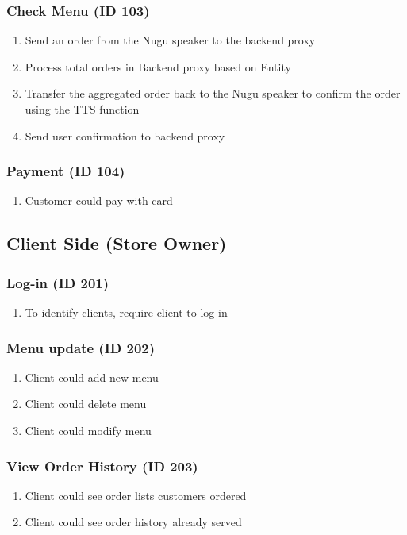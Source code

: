\documentclass[conference,compsoc]{IEEEtran}
\begin{document}
\subsubsection{Check Menu (ID 103)}
\begin{enumerate}
  \item Send an order from the Nugu speaker to the backend proxy
  \item Process total orders in Backend proxy based on Entity
  \item Transfer the aggregated order back to the Nugu speaker to confirm the order using the TTS function
  \item Send user confirmation to backend proxy
\end{enumerate}

\subsubsection{Payment (ID 104)}
\begin{enumerate}
  \item Customer could pay with card  
\end{enumerate}

\subsection{Client Side (Store Owner)}

\subsubsection{Log-in (ID 201)}
\begin{enumerate}
  \item To identify clients, require client to log in  
\end{enumerate}

\subsubsection{Menu update (ID 202)}
\begin{enumerate}
  \item Client could add new menu
  \item Client could delete menu
  \item Client could modify menu  
\end{enumerate}

\subsubsection{View Order History (ID 203)}
\begin{enumerate}
  \item Client could see order lists customers ordered
  \item Client could see order history already served
\end{enumerate}
\end{document}
